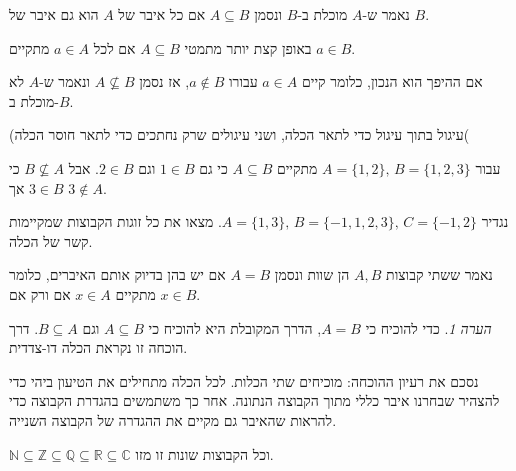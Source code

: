 \documentclass[
  hebrew,
  12pt,
  a4paper,
  oneside]{book}
\theoremstyle{definition}
\theoremstyle{remark}
\theoremstyle{plain}
\theoremstyle{remark}
\newtheorem*{remark}{הערה}
\begin{document}
\begin{definition}

נאמר ש-\(A\) מוכלת ב-\(B\) ונסמן \(A\subseteq B\) אם כל איבר של \(A\)
הוא גם איבר של \(B\).

באופן קצת יותר מתמטי \(A\subseteq B\) אם לכל \(a\in A\) מתקיים
\(a\in B\).

אם ההיפך הוא הנכון, כלומר קיים \(a\in A\) עבורו \(a\notin B\), אז נסמן
\(A\nsubseteq B\) ונאמר ש-\(A\) לא מוכלת ב-\(B\).

\end{definition}

(עיגול בתוך עיגול כדי לתאר הכלה, ושני עיגולים שרק נחתכים כדי לתאר חוסר
הכלה(

\begin{example}

עבור \(A=\{1,2\},\,B=\{1,2,3\}\) מתקיים \(A\subseteq B\) כי גם
\(1\in B\) וגם \(2\in B\). אבל \(B\nsubseteq A\) כי \(3\in B\) אך
\(3\notin A\).

\end{example}

נגדיר \(A=\{1,3\},\,B=\{-1,1,2,3\},\,C=\{-1,2\}\). מצאו את כל זוגות
הקבוצות שמקיימות קשר של הכלה.

\begin{definition}

נאמר ששתי קבוצות \(A,B\) הן שוות ונסמן \(A=B\) אם יש בהן בדיוק אותם
האיברים, כלומר מתקיים \(x\in A\) אם ורק אם \(x\in B\).

\end{definition}

\begin{remark}
כדי להוכיח כי \(A=B\), הדרך המקובלת היא להוכיח כי \(A\subseteq B\) וגם
\(B\subseteq A\). דרך הוכחה זו נקראת הכלה דו-צדדית.
\end{remark}

נסכם את רעיון ההוכחה: מוכיחים שתי הכלות. לכל הכלה מתחילים את הטיעון ביהי
כדי להצהיר שבחרנו איבר כללי מתוך הקבוצה הנתונה. אחר כך משתמשים בהגדרת
הקבוצה כדי להראות שהאיבר גם מקיים את ההגדרה של הקבוצה השנייה.

\begin{proposition}

\(\mathbb{N\subseteq\mathbb{Z}\subseteq\mathbb{Q}\subseteq\mathbb{R}\subseteq\mathbb{\mathbb{C}}}\)
וכל הקבוצות שונות זו מזו.

\end{proposition}
\end{document}
